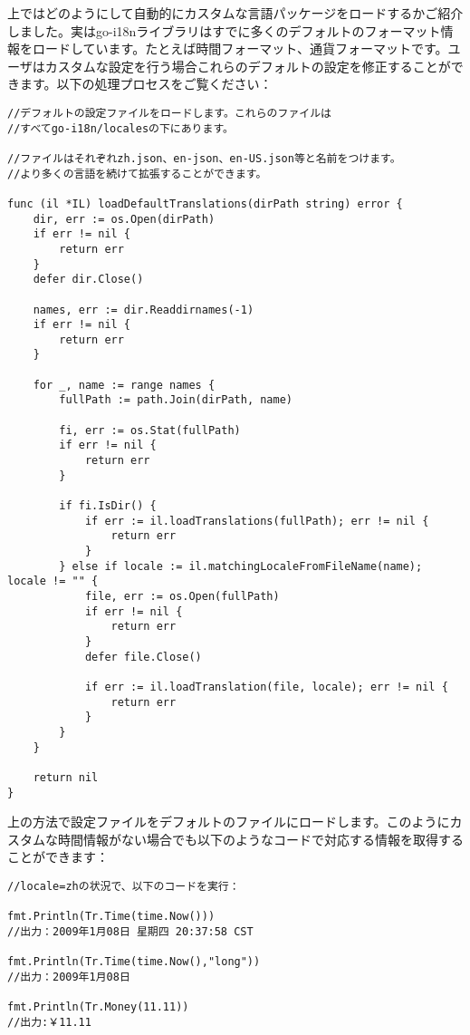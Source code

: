 上ではどのようにして自動的にカスタムな言語パッケージをロードするかご紹介しました。実はgo-i18nライブラリはすでに多くのデフォルトのフォーマット情報をロードしています。たとえば時間フォーマット、通貨フォーマットです。ユーザはカスタムな設定を行う場合これらのデフォルトの設定を修正することができます。以下の処理プロセスをご覧ください：

\begin{lstlisting}[numbers=none]
//デフォルトの設定ファイルをロードします。これらのファイルは
//すべてgo-i18n/localesの下にあります。

//ファイルはそれぞれzh.json、en-json、en-US.json等と名前をつけます。
//より多くの言語を続けて拡張することができます。

func (il *IL) loadDefaultTranslations(dirPath string) error {
    dir, err := os.Open(dirPath)
    if err != nil {
        return err
    }
    defer dir.Close()

    names, err := dir.Readdirnames(-1)
    if err != nil {
        return err
    }

    for _, name := range names {
        fullPath := path.Join(dirPath, name)

        fi, err := os.Stat(fullPath)
        if err != nil {
            return err
        }

        if fi.IsDir() {
            if err := il.loadTranslations(fullPath); err != nil {
                return err
            }
        } else if locale := il.matchingLocaleFromFileName(name); locale != "" {
            file, err := os.Open(fullPath)
            if err != nil {
                return err
            }
            defer file.Close()

            if err := il.loadTranslation(file, locale); err != nil {
                return err
            }
        }
    }

    return nil
}
\end{lstlisting}

上の方法で設定ファイルをデフォルトのファイルにロードします。このようにカスタムな時間情報がない場合でも以下のようなコードで対応する情報を取得することができます：

\begin{lstlisting}[numbers=none]
//locale=zhの状況で、以下のコードを実行：

fmt.Println(Tr.Time(time.Now()))
//出力：2009年1月08日 星期四 20:37:58 CST

fmt.Println(Tr.Time(time.Now(),"long"))
//出力：2009年1月08日

fmt.Println(Tr.Money(11.11))
//出力:￥11.11
\end{lstlisting}
